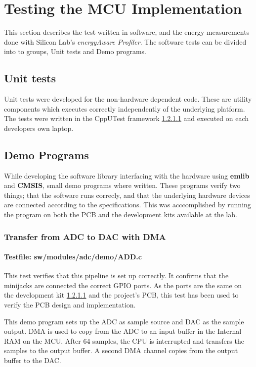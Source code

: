 \section{Testing the MCU Implementation}

This section describes the test written in software, and the energy measurements
done with Silicon Lab's \textit{energyAware Profiler}. The software tests can be
divided into to groups, Unit tests and Demo programs.

\subsection{Unit tests}

Unit tests were developed for the non-hardware dependent code. These are
utility components which executes correctly independently of the underlying
platform. The tests were written in the CppUTest framework \ref{} and executed
on each developers own laptop.

\subsection{Demo Programs}

While developing the software library interfacing with the hardware using {\bf
emlib} and {\bf CMSIS}, small demo programs where written. These programs verify
two things; that the software runs correcly, and that the underlying hardware
devices are connected according to the specifications. This was acccomplished by
running the program on both the PCB and the development kits available at the
lab.

\subsubsection{Transfer from ADC to DAC with DMA}
\paragraph{Testfile: sw/modules/adc/demo/ADD.c}

This test verifies that this pipeline is set up correctly. It confirms that the minijacks
are connected the correct GPIO ports. As the ports are the same on the development kit \ref{}
and the project's PCB, this test has been used to verify the PCB design and implementation.

This demo program sets up the ADC as sample source and DAC as the sample output. DMA is
used to copy from the ADC to an input buffer in the Internal RAM on the MCU. After 64 samples,
the CPU is interrupted and transfers the samples to the output buffer. A second DMA channel
copies from the output buffer to the DAC.

